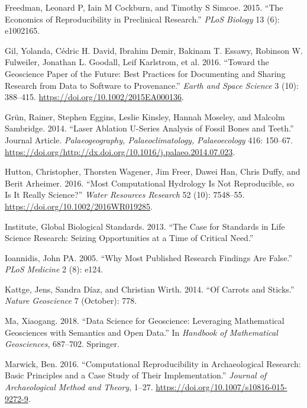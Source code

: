 \documentclass[]{elsarticle} %
\begin{document}
\leavevmode\hypertarget{ref-freedman2015economics}{}%
Freedman, Leonard P, Iain M Cockburn, and Timothy S Simcoe. 2015. ``The Economics of Reproducibility in Preclinical Research.'' \emph{PLoS Biology} 13 (6): e1002165.

\leavevmode\hypertarget{ref-Gil_et_al_2016}{}%
Gil, Yolanda, Cédric H. David, Ibrahim Demir, Bakinam T. Essawy, Robinson W. Fulweiler, Jonathan L. Goodall, Leif Karlstrom, et al. 2016. ``Toward the Geoscience Paper of the Future: Best Practices for Documenting and Sharing Research from Data to Software to Provenance.'' \emph{Earth and Space Science} 3 (10): 388--415. \url{https://doi.org/10.1002/2015EA000136}.

\leavevmode\hypertarget{ref-Gruen2014}{}%
Grün, Rainer, Stephen Eggins, Leslie Kinsley, Hannah Moseley, and Malcolm Sambridge. 2014. ``Laser Ablation U-Series Analysis of Fossil Bones and Teeth.'' Journal Article. \emph{Palaeogeography, Palaeoclimatology, Palaeoecology} 416: 150--67. \url{https://doi.org/http://dx.doi.org/10.1016/j.palaeo.2014.07.023}.

\leavevmode\hypertarget{ref-Hutton_et_al_2016}{}%
Hutton, Christopher, Thorsten Wagener, Jim Freer, Dawei Han, Chris Duffy, and Berit Arheimer. 2016. ``Most Computational Hydrology Is Not Reproducible, so Is It Really Science?'' \emph{Water Resources Research} 52 (10): 7548--55. \url{https://doi.org/10.1002/2016WR019285}.

\leavevmode\hypertarget{ref-global2013case}{}%
Institute, Global Biological Standards. 2013. ``The Case for Standards in Life Science Research: Seizing Opportunities at a Time of Critical Need.''

\leavevmode\hypertarget{ref-ioannidis2005most}{}%
Ioannidis, John PA. 2005. ``Why Most Published Research Findings Are False.'' \emph{PLoS Medicine} 2 (8): e124.

\leavevmode\hypertarget{ref-Kattge_Duxedaz_Wirth_2014}{}%
Kattge, Jens, Sandra Díaz, and Christian Wirth. 2014. ``Of Carrots and Sticks.'' \emph{Nature Geoscience} 7 (October): 778.

\leavevmode\hypertarget{ref-ma2018data}{}%
Ma, Xiaogang. 2018. ``Data Science for Geoscience: Leveraging Mathematical Geosciences with Semantics and Open Data.'' In \emph{Handbook of Mathematical Geosciences}, 687--702. Springer.

\leavevmode\hypertarget{ref-Marwick2016repro}{}%
Marwick, Ben. 2016. ``Computational Reproducibility in Archaeological Research: Basic Principles and a Case Study of Their Implementation.'' \emph{Journal of Archaeological Method and Theory}, 1--27. \url{https://doi.org/10.1007/s10816-015-9272-9}.
\end{document}
